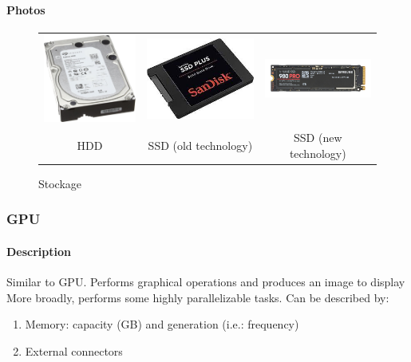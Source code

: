 \documentclass[11pt]{article}
\begin{document}
				\paragraph{Photos}
					\begin{figure}[h!]
							\centering
							\begin{tabular}[!h]{c|c|c}
								\includegraphics[width=5cm]{figures/HDD.jpg} & \includegraphics[width=5cm]{figures/SSD.jpeg}
								& \includegraphics[width=5cm]{figures/M2.jpg}
								\\
								HDD & SSD (old technology) & SSD (new technology)
							\end{tabular}
							\caption{Stockage}
					\end{figure}

			\subsubsection{GPU}

				\paragraph{Description}
					Similar to GPU. Performs graphical operations and produces an image to display 
					More broadly, performs some highly parallelizable tasks. Can be described by:
					\begin{enumerate}
							\item Memory: capacity (GB) and generation (i.e.: frequency)
							\item External connectors
					\end{enumerate}
\end{document}
